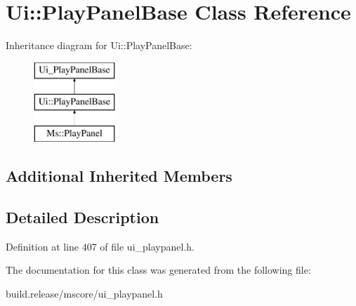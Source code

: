 \hypertarget{class_ui_1_1_play_panel_base}{}\section{Ui\+:\+:Play\+Panel\+Base Class Reference}
\label{class_ui_1_1_play_panel_base}
Inheritance diagram for Ui\+:\+:Play\+Panel\+Base\+:\begin{figure}[H]
\begin{center}
\leavevmode
\includegraphics[height=3.000000cm]{class_ui_1_1_play_panel_base}
\end{center}
\end{figure}
\subsection*{Additional Inherited Members}


\subsection{Detailed Description}


Definition at line 407 of file ui\+\_\+playpanel.\+h.



The documentation for this class was generated from the following file\+:\begin{DoxyCompactItemize}
\item 
build.\+release/mscore/ui\+\_\+playpanel.\+h\end{DoxyCompactItemize}
